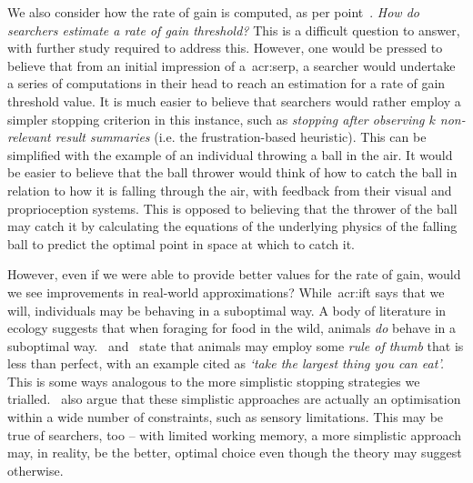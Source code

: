 We also consider how the rate of gain is computed, as per point~. \emph{How do searchers estimate a rate of gain threshold?} This is a difficult question to answer, with further study required to address this. However, one would be pressed to believe that from an initial impression of a~\gls{acr:serp}, a searcher would undertake a series of computations in their head to reach an estimation for a rate of gain threshold value. It is much easier to believe that searchers would rather employ a simpler stopping criterion in this instance, such as \emph{stopping after observing $k$ non-relevant result summaries} (i.e. the frustration-based heuristic). This can be simplified with the example of an individual throwing a ball in the air. It would be easier to believe that the ball thrower would think of how to catch the ball in relation to how it is falling through the air, with feedback from their visual and proprioception systems. This is opposed to believing that the thrower of the ball may catch it by calculating the equations of the underlying physics of the falling ball to predict the optimal point in space at which to catch it.

However, even if we were able to provide better values for the rate of gain, would we see improvements in real-world approximations? While~\gls{acr:ift} says that we will, individuals may be behaving in a suboptimal way. A body of literature in ecology suggests that when foraging for food in the wild, animals \emph{do} behave in a suboptimal way.~\cite{janetos1981imperfectly} and~\cite{krebs1983perspectives} state that animals may employ some \emph{rule of thumb} that is less than perfect, with an example cited as \emph{`take the largest thing you can eat'.} This is some ways analogous to the more simplistic stopping strategies we trialled.~\cite{krebs1983perspectives} also argue that these simplistic approaches are actually an optimisation within a wide number of constraints, such as sensory limitations. This may be true of searchers, too -- with limited working memory, a more simplistic approach may, in reality, be the better, optimal choice even though the theory may suggest otherwise.

